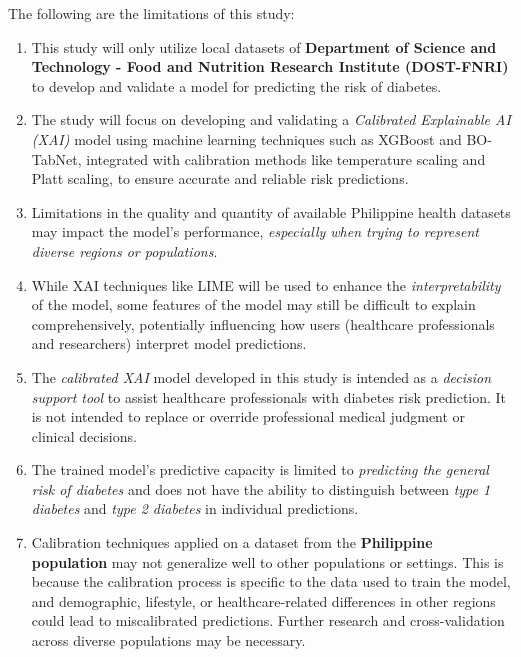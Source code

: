 \documentclass[11pt,a4paper,titlepage]{article}
\begin{document}
The following are the limitations of this study:

\begin{enumerate}
    \item This study will only utilize local datasets of \textbf{Department of Science and Technology - Food and Nutrition Research Institute (DOST-FNRI)} to develop and validate a model for predicting the risk of diabetes.
    
    \item The study will focus on developing and validating a \textit{Calibrated Explainable AI (XAI)} model using machine learning techniques such as XGBoost and BO-TabNet, integrated with calibration methods like temperature scaling and Platt scaling, to ensure accurate and reliable risk predictions.
    
    \item Limitations in the quality and quantity of available Philippine health datasets may impact the model’s performance, \textit{especially when trying to represent diverse regions or populations}.
    
    \item While XAI techniques like LIME will be used to enhance the \textit{interpretability} of the model, some features of the model may still be difficult to explain comprehensively, potentially influencing how users (healthcare professionals and researchers) interpret model predictions.
    
    \item The \textit{calibrated XAI} model developed in this study is intended as a \textit{decision support tool} to assist healthcare professionals with diabetes risk prediction. It is not intended to replace or override professional medical judgment or clinical decisions.
    
    \item The trained model’s predictive capacity is limited to \textit{predicting the general risk of diabetes} and does not have the ability to distinguish between \textit{type 1 diabetes} and \textit{type 2 diabetes} in individual predictions.
    
    \item Calibration techniques applied on a dataset from the \textbf{Philippine population} may not generalize well to other populations or settings. This is because the calibration process is specific to the data used to train the model, and demographic, lifestyle, or healthcare-related differences in other regions could lead to miscalibrated predictions. Further research and cross-validation across diverse populations may be necessary.
\end{enumerate}
\end{document}
